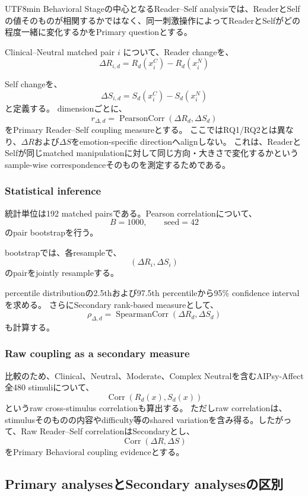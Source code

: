\documentclass{article} %
\begin{document}
\begin{CJK*}{UTF8}{min}
Behavioral Stageの中心となるReader--Self analysisでは、ReaderとSelfの値そのものが相関するかではなく、同一刺激操作によってReaderとSelfがどの程度一緒に変化するかをPrimary questionとする。

Clinical--Neutral matched pair \(i\) について、Reader changeを、
\[
\Delta R_{i,d}
=
R_d(x_i^{C})
-
R_d(x_i^{N})
\]

Self changeを、
\[
\Delta S_{i,d}
=
S_d(x_i^{C})
-
S_d(x_i^{N})
\]
と定義する。
dimensionごとに、
\[
r_{\Delta,d}
=
\operatorname{PearsonCorr}
(
\Delta R_d,
\Delta S_d
)
\]
をPrimary Reader--Self coupling measureとする。
ここではRQ1/RQ2とは異なり、\(\Delta R\)および\(\Delta S\)をemotion-specific directionへalignしない。
これは、ReaderとSelfが同じmatched manipulationに対して同じ方向・大きさで変化するかというsample-wise correspondenceそのものを測定するためである。


\subsubsection{Statistical inference}

統計単位は192 matched pairsである。Pearson correlationについて、
\[
B=1000,
\qquad
\text{seed}=42
\]
のpair bootstrapを行う。

bootstrapでは、各resampleで、
\[
(
\Delta R_i,
\Delta S_i
)
\]
のpairをjointly resampleする。

percentile distributionの2.5thおよび97.5th percentileから95\% confidence intervalを求める。
さらにSecondary rank-based measureとして、
\[
\rho_{\Delta,d}
=
\operatorname{SpearmanCorr}
(
\Delta R_d,
\Delta S_d
)
\]
も計算する。


\subsubsection{Raw coupling as a secondary measure}

比較のため、Clinical、Neutral、Moderate、Complex Neutralを含むAIPsy-Affect全480 stimuliについて、
\[
\operatorname{Corr}
(
R_d(x),
S_d(x)
)
\]
というraw cross-stimulus correlationも算出する。
ただしraw correlationは、stimulusそのものの内容やdifficulty等のshared variationを含み得る。したがって、Raw Reader--Self correlationはSecondaryとし、
\[
\operatorname{Corr}
(
\Delta R,
\Delta S
)
\]
をPrimary Behavioral coupling evidenceとする。


\subsection{Primary analysesとSecondary analysesの区別}
\label{app:behavioral-primary-secondary}


\end{CJK*}
\end{document}
